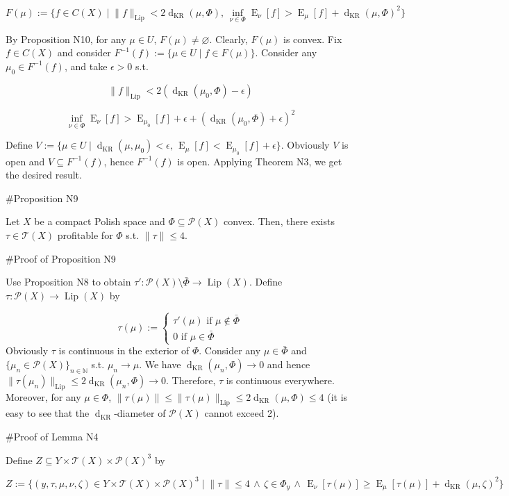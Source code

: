 \documentclass[a4paper]{article}
\DeclareMathOperator{\E}{E}
\newcommand{\Nats}{\mathbb{N}}
\newcommand{\Sq}[2]{\{#1\}_{#2 \in \Nats}}
\newcommand{\Sqn}[1]{\Sq{#1}{n}}
\newcommand{\Norm}[1]{\lVert #1 \rVert}
\newcommand{\Prob}{\mathcal{P}}
\newcommand{\T}{\mathcal{T}}
\newcommand{\Lip}{\operatorname{Lip}}
\newcommand{\NormL}[1]{\Norm{#1}_{\operatorname{Lip}}}
\newcommand{\Dkr}{\operatorname{d}_{\text{KR}}}
\begin{document}
$$F(\mu):=\{f \in C(X) \mid \NormL{f} < 2 \Dkr(\mu, \Phi),\, \inf_{\nu \in \Phi} \E_\nu[f] > \E_\mu[f] + \Dkr(\mu,\Phi)^2\}$$

By Proposition N10, for any $\mu \in U$, $F(\mu) \ne \varnothing$. Clearly, $F(\mu)$ is convex. Fix $f \in C(X)$ and consider $F^{-1}(f):=\{\mu \in U \mid f \in F(\mu)\}$. Consider any $\mu_0 \in F^{-1}(f)$, and take $\epsilon > 0$ s.t.

$$\NormL{f} < 2 (\Dkr(\mu_0, \Phi) - \epsilon)$$

$$\inf_{\nu \in \Phi} \E_\nu[f] > \E_{\mu_0}[f] + \epsilon + (\Dkr(\mu_0,\Phi) + \epsilon)^2$$

Define $V := \{\mu \in U \mid \Dkr(\mu,\mu_0) < \epsilon,\, \E_\mu[f] < \E_{\mu_0}[f] + \epsilon\}$. Obviously $V$ is open and $V \subseteq F^{-1}(f)$, hence $F^{-1}(f)$ is open. Applying Theorem N3, we get the desired result.

\#Proposition N9

Let $X$ be a compact Polish space and $\Phi \subseteq \Prob(X)$ convex. Then, there exists $\tau \in \T(X)$ profitable for $\Phi$ s.t. $\Norm{\tau} \leq 4$.

\#Proof of Proposition N9

Use Proposition N8 to obtain $\tau': \Prob(X) \setminus \bar{\Phi} \rightarrow \Lip(X)$. Define $\tau: \Prob(X) \rightarrow \Lip(X)$ by

$$\tau(\mu):=\begin{cases}\tau'(\mu) \text{ if } \mu \not\in \bar{\Phi}\\0 \text { if } \mu \in \bar{\Phi}\end{cases}$$ 
Obviously $\tau$ is continuous in the exterior of $\Phi$. Consider any $\mu \in \bar{\Phi}$ and $\Sqn{\mu_n \in \Prob(X)}$ s.t. $\mu_n \rightarrow \mu$. We have $\Dkr(\mu_n,\Phi) \rightarrow 0$ and hence $\NormL{\tau(\mu_n)} \leq 2\Dkr(\mu_n,\Phi) \rightarrow 0$. Therefore, $\tau$ is continuous everywhere. Moreover, for any $\mu \in \Phi$, $\Norm{\tau(\mu)} \leq \NormL{\tau(\mu)} \leq 2 \Dkr(\mu, \Phi) \leq 4$ (it is easy to see that the $\Dkr$-diameter of $\Prob(X)$ cannot exceed 2).

\#Proof of Lemma N4

Define $Z \subseteq Y \times \T(X) \times \Prob(X)^3$ by

$$Z:=\{(y,\tau,\mu,\nu,\zeta) \in Y \times \T(X) \times \Prob(X)^3 \mid \Norm{\tau} \leq 4 \,\land\, \zeta \in \Phi_y \,\land\, \E_\nu[\tau(\mu)] \geq \E_\mu[\tau(\mu)] + \Dkr(\mu,\zeta)^2\}$$
\end{document}
